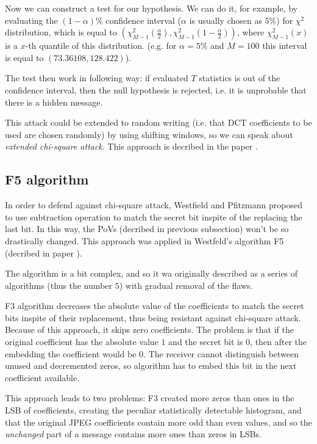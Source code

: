 Now we can construct a test for our hypothesis. We can do it, for example, by evaluating
the $(1 - \alpha)\%$ confidence interval ($\alpha$ is usually chosen as $5\%$) for $\chi^2$ distribution, which is equal to 
$\left( \chi^2_{M-1}\left(\frac{\alpha}{2}\right), \chi^2_{M-1}\left(1 - \frac{\alpha}{2}\right) \right)$, where $\chi^2_{M-1}(x)$ 
is a $x$-th quantile of this distribution.
(e.g. for $\alpha = 5\%$
and $M=100$ this interval is equal to $(73.36108, 128.422)$). 

The test then work in following way: if evaluated $T$ statistics is 
out of the confidence interval, then the null hypothesis is rejected, i.e. it is unprobable that there is a hidden message. 

This attack could be extended to random writing (i.e. that DCT coefficients to be used
are chosen randomly) by using shifting windows, so we can speak about \textit{extended chi-square attack}. 
This approach is decribed in the paper \cite{provos2001detecting}.

\subsection{F5 algorithm}

In order to defend against chi-square attack, Westfield and Pfitzmann proposed to use 
subtraction operation to match the secret bit inspite of the replacing the last bit. In this way,
the PoVs (decribed in previous subsection) won't be so drastically changed. This approach was applied
in Westfeld's algorithm F5 (decribed in paper \cite{steganalysis2001f5}).

The algorithm is a bit complex, and so it wa originally described as a series of algorithms (thus the number $5$)
with gradual removal of the flaws.

F3 algorithm decreases the absolute value of the coefficients to match the secret bits inspite of their replacement, 
thus being resistant against chi-square attack. Because of this approach, it skips zero coefficients. The problem is
that if the original coefficient has the absolute value $1$ and the secret bit is $0$, then after the embedding
the coefficient would be $0$. The receiver cannot distinguish between unused and decremented zeros, so algorithm
has to embed this bit in the next coefficient available.

This approach leads to two problems: F3 created more zeros than ones in the LSB of coefficients, creating the peculiar
statistically detectable histogram, and that the original JPEG coefficients contain more odd than even values, and so
the \emph{unchanged} part of a message contains more ones than zeros in LSBs.


